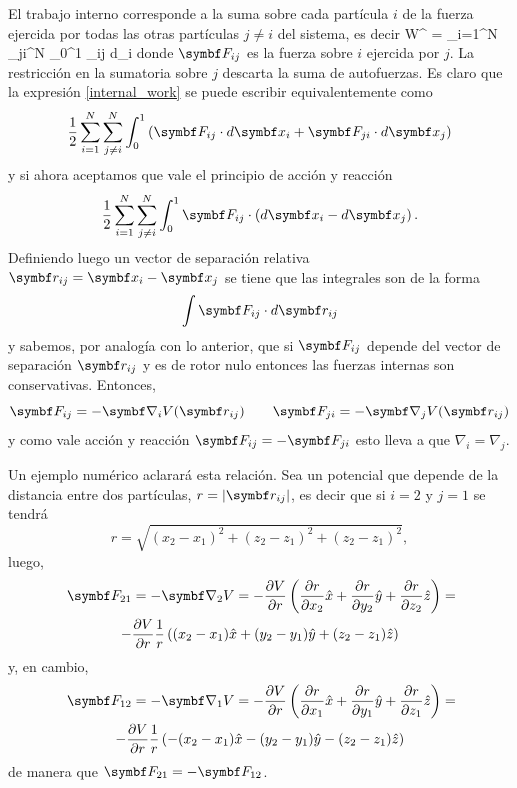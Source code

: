 \documentclass[10pt,oneside]{CBFT_book}
\begin{document}
El trabajo interno corresponde a la suma sobre cada partícula $i$ de la fuerza ejercida por todas las otras partículas 
$j \neq i$ del sistema, es decir
\be
	W^{} = \sum_{i=1}^N \sum_{j\neq i}^N \int_0^1 _{ij} \cdot d_i
	\label{internal_work}
\ee
donde $\vb{F}_{ij} $ es la fuerza sobre $i$ ejercida por $j$. La restricción en la sumatoria sobre $j$ descarta la suma 
de autofuerzas. Es claro que la expresión \eqref{internal_work} se puede escribir equivalentemente como
\[
	\frac{1}{2} \sum_{i=1}^N \sum_{j\neq i}^N \int_0^1 
	\left( \vb{F}_{ij} \cdot d\vb{x}_i + \vb{F}_{ji} \cdot d\vb{x}_j \right) 
\]
%
y si ahora aceptamos que vale el principio de acción y reacción
\[
	\frac{1}{2} \sum_{i=1}^N \sum_{j\neq i}^N \int_0^1 
	\vb{F}_{ij} \cdot \left(d\vb{x}_i - d\vb{x}_j \right) .
\]
Definiendo luego un vector de separación relativa $ \vb{r}_{ij} = \vb{x}_i - \vb{x}_j $ se tiene que las integrales son 
de la forma 
\[
	\int \vb{F}_{ij} \cdot d\vb{r}_{ij}
\]
y sabemos, por analogía con lo anterior, que si $\vb{F}_{ij}$ depende del vector de separación $ \vb{r}_{ij} $ y es de 
rotor nulo entonces las fuerzas internas son conservativas.
Entonces,
\[
	\vb{F}_{ij} = -\Nabla_i V(\vb{r}_{ij}) \qquad \vb{F}_{ji} = -\Nabla_j V(\vb{r}_{ij})
\]
y como vale acción y reacción $\vb{F}_{ij} = - \vb{F}_{ji}$ esto lleva a que $\nabla_i = \nabla_j$.

Un ejemplo numérico aclarará esta relación. Sea un potencial que depende de la distancia entre dos partículas,
$r = |\vb{r}_{ij}|$, es decir que si $i=2$ y $j=1$ se tendrá
\[
	r = \sqrt{ (x_2-x_1)^2 + (z_2-z_1)^2 + (z_2-z_1)^2 },
\]
luego,
\begin{multline*}
	\: \vb{F}_{21} = -\Nabla_2 V = -\dpar{V}{r} \left( \dpar{r}{x_2}\hat{x} + \dpar{r}{y_2}\hat{y} + 
	\dpar{r}{z_2}\hat{z} \right) = \\ 
	-\dpar{V}{r} \frac 1 r \left( (x_2-x_1)\hat{x} + (y_2-y_1)\hat{y} + (z_2-z_1)\hat{z} \right)
\end{multline*}
y, en cambio,
\begin{multline*}
	\: \vb{F}_{12} = -\Nabla_1 V = -\dpar{V}{r} \left( \dpar{r}{x_1}\hat{x} + \dpar{r}{y_1}\hat{y} + 
	\dpar{r}{z_1}\hat{z} \right) = \\ 
	-\dpar{V}{r} \frac 1 r \left( -(x_2-x_1)\hat{x} - (y_2-y_1)\hat{y} - (z_2-z_1)\hat{z} \right)
\end{multline*}
de manera que $ \vb{F}_{21} = -\vb{F}_{12} $.
\end{document}
